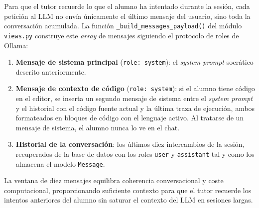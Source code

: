 Para que el tutor recuerde lo que el alumno ha intentado durante la sesión, cada petición al LLM no envía únicamente el último mensaje del usuario, sino toda la conversación acumulada. La función \texttt{\_build\_messages\_payload()} del módulo \texttt{views.py} construye este \textit{array} de mensajes siguiendo el protocolo de roles de Ollama:

\begin{enumerate}
    \item \textbf{Mensaje de sistema principal} (\texttt{role: system}): el \textit{system prompt} socrático descrito anteriormente.
    \item \textbf{Mensaje de contexto de código} (\texttt{role: system}): si el alumno tiene código en el editor, se inserta un segundo mensaje de sistema entre el \textit{system prompt} y el historial con el código fuente actual y la última traza de ejecución, ambos formateados en bloques de código con el lenguaje activo. Al tratarse de un mensaje de sistema, el alumno nunca lo ve en el chat.
    \item \textbf{Historial de la conversación}: los últimos diez intercambios de la sesión, recuperados de la base de datos con los roles \texttt{user} y \texttt{assistant} tal y como los almacena el modelo \texttt{Message}.
\end{enumerate}

La ventana de diez mensajes equilibra coherencia conversacional y coste computacional, proporcionando suficiente contexto para que el tutor recuerde los intentos anteriores del alumno sin saturar el contexto del LLM en sesiones largas.

